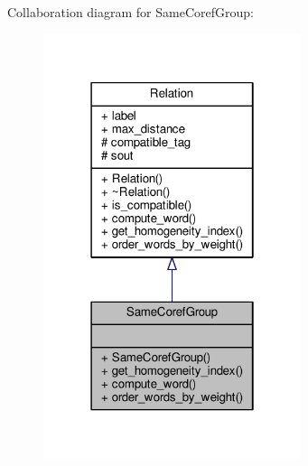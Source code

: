 Collaboration diagram for Same\+Coref\+Group\+:\nopagebreak
\begin{figure}[H]
\begin{center}
\leavevmode
\includegraphics[width=214pt]{classSameCorefGroup__coll__graph}
\end{center}
\end{figure}
